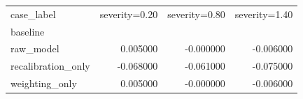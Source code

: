 \begin{tabular}{lrrr}
\toprule
case_label & severity=0.20 & severity=0.80 & severity=1.40 \\
baseline &  &  &  \\
\midrule
raw_model & 0.005000 & -0.000000 & -0.006000 \\
recalibration_only & -0.068000 & -0.061000 & -0.075000 \\
weighting_only & 0.005000 & -0.000000 & -0.006000 \\
\bottomrule
\end{tabular}
